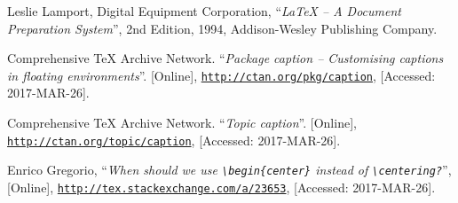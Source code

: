 \documentclass[article,a4paper,oneside,10pt]{memoir}
\begin{document}
\newpage
\begin{thebibliography}{1}

        Leslie Lamport, Digital Equipment Corporation,
        ``\emph{\LaTeX{} -- A Document Preparation System}'',
        2nd Edition,
        1994,
        Addison-Wesley Publishing Company.

        Comprehensive \TeX{} Archive Network.
        ``\emph{Package caption -- Customising captions in floating environments}''.
        [Online],
        \href{http://ctan.org/pkg/caption}{\nolinkurl{http://ctan.org/pkg/caption}},
        [Accessed: 2017-MAR-26].

        Comprehensive \TeX{} Archive Network.
        ``\emph{Topic caption}''.
        [Online],
        \href{http://ctan.org/topic/caption}{\nolinkurl{http://ctan.org/topic/caption}},
        [Accessed: 2017-MAR-26].

        Enrico Gregorio,
        ``\emph{When should we use \texttt{\textbackslash{}begin\{center\}} 
        instead of \texttt{\textbackslash{}centering?}}'',
        [Online],
        \href{http://tex.stackexchange.com/a/23653}
             {\nolinkurl{http://tex.stackexchange.com/a/23653}},
        [Accessed: 2017-MAR-26].

\end{thebibliography}
\end{document}
